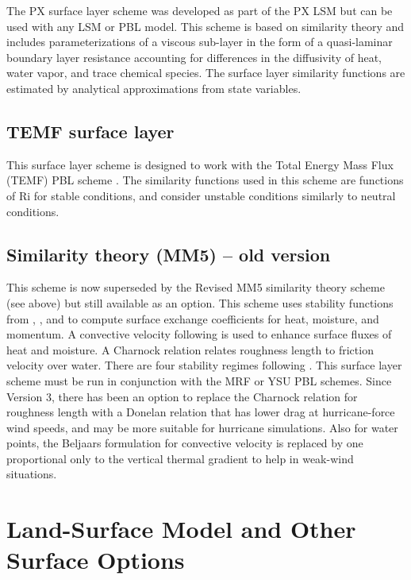 The PX surface layer scheme \citep{pleim06} was developed as part of the PX LSM but can be used with any LSM or PBL model.  This scheme is based on similarity theory and includes parameterizations of a viscous sub-layer in the form of a quasi-laminar boundary layer resistance accounting for differences in the diffusivity of heat, water vapor, and trace chemical species.   The surface layer similarity functions are estimated by analytical approximations from state variables.  

\subsection{TEMF surface layer}

This surface layer scheme is designed to work with the Total Energy Mass Flux (TEMF) PBL scheme
\citep{angevine10}. The similarity functions used in this scheme are functions of Ri for stable conditions,
and consider unstable conditions similarly to neutral conditions.

\subsection{Similarity theory (MM5) -- old version}

This scheme is now superseded by the Revised MM5 similarity theory scheme
(see above) but still available as an option.
This scheme uses stability functions from \citet{paulson70}, \citet{dyer70}, 
and \citet{webb70}
to compute surface exchange coefficients for heat, moisture, and momentum. 
A convective velocity following \citet{beljaars94} is used to enhance surface 
fluxes of heat and moisture. A Charnock relation relates 
roughness length to friction velocity over water. There are four stability 
regimes following \citet{zhanganthes82}.
This surface layer scheme must be run in conjunction with the MRF or
YSU PBL schemes. Since Version 3, there has been an option to replace the Charnock
relation for roughness length with a Donelan relation that has lower
drag at hurricane-force wind speeds, and may be more suitable for hurricane
simulations. Also for water points, the Beljaars formulation for convective
velocity is replaced by one proportional only to the vertical thermal gradient
to help in weak-wind situations.



\section{Land-Surface Model and Other Surface Options}


